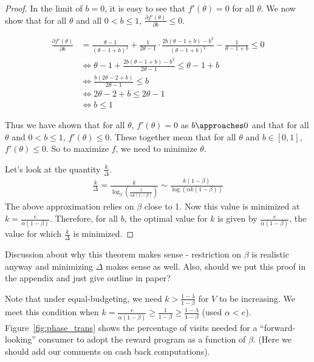 \begin{proof}
In the limit of $b = 0$, it is easy to see that $f'(\theta) = 0$ for all $\theta$. We now show that for all $\theta$ and all $0 < b \leq 1$, $\frac{\partial f'(\theta)}{\partial b} \leq 0$.

\begin{align*}
\frac{\partial f'(\theta)}{\partial b} &= \frac{\theta-1}{(\theta-1+b)^2}+\frac{1}{2\theta-1}\cdot \frac{2b(\theta-1+b)-b^2}{(\theta-1+b)^2} -\frac{1}{\theta-1+b} \leq 0 \\
&\iff \theta-1 + \frac{2b(\theta-1+b)-b^2}{2\theta-1} \leq \theta-1+b \\
&\iff \frac{b(2\theta-2+b)}{2\theta-1} \leq b \\
&\iff 2\theta-2+b \leq 2\theta-1 \\
&\iff b \leq 1
\end{align*}

Thus we have shown that for all $\theta$, $f'(\theta) = 0$ as $b \approaches 0$ and that for all $\theta$ and $0 < b \leq 1$, $f'(\theta) \leq 0$. These together mean that for all $\theta$ and $b \in [0,1]$, $f'(\theta) \leq 0$. So to maximize $f$, we need to minimize $\theta$.

Let's look at the quantity $\frac{k}{\Delta}$.
\begin{align*}
\frac{k}{\Delta} = \frac{k}{\log_\beta\left(\frac{1}{\alpha k(1-\beta)}\right)} \sim \frac{k(1-\beta)}{\log (\alpha k(1-\beta))} 
\end{align*}
The above approximation relies on $\beta$ close to 1. Now this value is minimized at $k = \frac{e}{\alpha(1-\beta)}$. Therefore, for all $b$, the optimal value for $k$ is given by $\frac{e}{\alpha(1-\beta)}$, the value for which $\frac{k}{\Delta}$ is minimized. 

\end{proof}

{\nolan Discussion about why this theorem makes sense - restriction on $\beta$ is realistic anyway and minimizing $\Delta$ makes sense as well. Also, should we put this proof in the appendix and just give outline in paper?}

Note that under equal-budgeting, we need $k > \frac{1-\lambda}{1-\beta}$ for $V$ to be increasing. We meet this condition when $k = \frac{e}{\alpha(1-\beta)} \geq \frac{1}{1-\beta} \geq \frac{1-\lambda}{1-\beta}$ ({\nolan used $\alpha < e$}). Figure~\ref{fig:phase_trans} shows the percentage of visits needed for a ``forward-looking'' consumer to adopt the reward program as a function of $\beta$. (Here we should add our comments on cash back computations).

